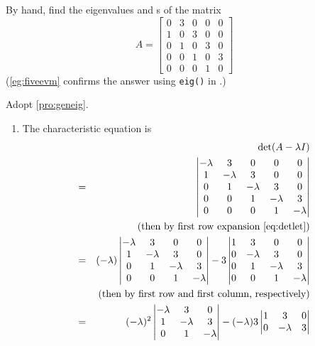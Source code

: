 \begin{example} \label{eg:fiveev}
By hand, find the eigenvalues and s of the matrix
\begin{equation*}
A=\begin{bmatrix}0&3&0&0&0
\\1&0&3&0&0
\\0&1&0&3&0
\\0&0&1&0&3
\\0&0&0&1&0\end{bmatrix}
\end{equation*}
(\autoref{eg:fiveevm} confirms the answer using \verb|eig()| in \script.)
\begin{solution} 
Adopt \autoref{pro:geneig}.
\begin{enumerate}
\item The characteristic equation is
\begin{eqnarray*}
&&\det(A-\lambda I)
\\&=&\begin{vmatrix}-\lambda&3&0&0&0
\\1&-\lambda&3&0&0
\\0&1&-\lambda&3&0
\\0&0&1&-\lambda&3
\\0&0&0&1&-\lambda\end{vmatrix}
\\&&(\text{then by first row expansion~\eqref{eq:detlet}})
\\&=&(-\lambda)\begin{vmatrix}-\lambda&3&0&0
\\1&-\lambda&3&0
\\0&1&-\lambda&3
\\0&0&1&-\lambda\end{vmatrix}
-3\begin{vmatrix}1&3&0&0
\\0&-\lambda&3&0
\\0&1&-\lambda&3
\\0&0&1&-\lambda\end{vmatrix}
\\&&(\text{then by first row and first column, respectively})
\\&=&(-\lambda)^2\begin{vmatrix}-\lambda&3&0
\\1&-\lambda&3
\\0&1&-\lambda\end{vmatrix}
-(-\lambda)3\begin{vmatrix}1&3&0
\\0&-\lambda&3

\end{vmatrix}
\end{eqnarray*}
\end{enumerate}
\end{solution}
\end{example}
